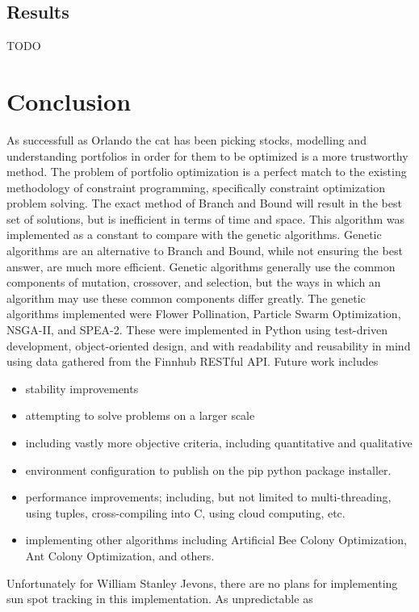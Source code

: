 \documentclass{article}
\begin{document}
    \subsection{Results}
    TODO
    \section{Conclusion}
    As successfull as Orlando the cat has been picking stocks, modelling and understanding portfolios in order for them to be optimized is a more trustworthy 
    method. The problem of portfolio optimization is a perfect match to the existing methodology of constraint programming, specifically constraint optimization 
    problem solving. The exact method of Branch and Bound will result in the best set of solutions, but is inefficient in terms of time and space. This algorithm
    was implemented as a constant to compare with the genetic algorithms. Genetic algorithms are an alternative to Branch and Bound, while not ensuring the best 
    answer, are much more efficient. Genetic algorithms generally use the common components of mutation, crossover, and selection, but the ways in which an 
    algorithm may use these common components differ greatly. The genetic algorithms implemented were Flower Pollination, Particle Swarm Optimization, NSGA-II, 
    and SPEA-2. These were implemented in Python using test-driven development, object-oriented design, and with readability and reusability in mind using data 
    gathered from the Finnhub RESTful API. Future work includes 
    \begin{itemize}
        \item stability improvements
        \item attempting to solve problems on a larger scale
        \item including vastly more objective criteria, including quantitative and qualitative
        \item environment configuration to publish on the pip python package installer.
        \item performance improvements; including, but not limited to multi-threading, using tuples, cross-compiling into C, using cloud computing, etc.
        \item implementing other algorithms including Artificial Bee Colony Optimization, Ant Colony Optimization, and others.
    \end{itemize}
    Unfortunately for William Stanley Jevons, there are no plans for implementing sun spot tracking in this implementation. As unpredictable as
\end{document}
